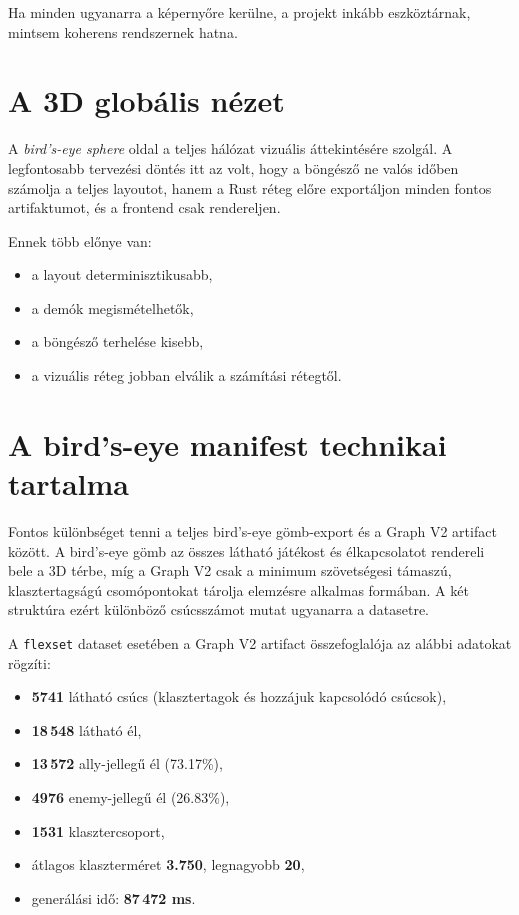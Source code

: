 Ha minden ugyanarra a képernyőre kerülne, a projekt inkább eszköztárnak, mintsem koherens rendszernek hatna.

\section{A 3D globális nézet}

A \emph{bird's-eye sphere} oldal a teljes hálózat vizuális áttekintésére szolgál. A legfontosabb tervezési döntés itt az volt, hogy a böngésző ne valós időben számolja a teljes layoutot, hanem a Rust réteg előre exportáljon minden fontos artifaktumot, és a frontend csak rendereljen.

Ennek több előnye van:

\begin{itemize}
    \item a layout determinisztikusabb,
    \item a demók megismételhetők,
    \item a böngésző terhelése kisebb,
    \item a vizuális réteg jobban elválik a számítási rétegtől.
\end{itemize}

\section{A bird's-eye manifest technikai tartalma}

Fontos különbséget tenni a teljes bird's-eye gömb-export és a Graph V2 artifact között. A bird's-eye gömb az összes látható játékost és élkapcsolatot rendereli bele a 3D térbe, míg a Graph V2 csak a minimum szövetségesi támaszú, klasztertagságú csomópontokat tárolja elemzésre alkalmas formában. A két struktúra ezért különböző csúcsszámot mutat ugyanarra a datasetre.

A \texttt{flexset} dataset esetében a Graph V2 artifact összefoglalója az alábbi adatokat rögzíti:

\begin{itemize}
    \item \textbf{5741} látható csúcs (klasztertagok és hozzájuk kapcsolódó csúcsok),
    \item \textbf{18\,548} látható él,
    \item \textbf{13\,572} ally-jellegű él (73.17\%),
    \item \textbf{4976} enemy-jellegű él (26.83\%),
    \item \textbf{1531} klasztercsoport,
    \item átlagos klaszterméret \textbf{3.750}, legnagyobb \textbf{20},
    \item generálási idő: \textbf{87\,472 ms}.
\end{itemize}

